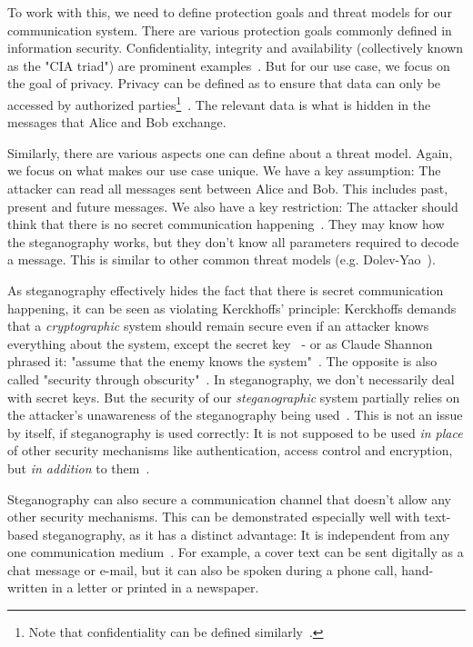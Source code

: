 To work with this, we need to define protection goals and threat models for our communication system. There are various protection goals commonly defined in information security. Confidentiality, integrity and availability (collectively known as the "CIA triad") are prominent examples~\cite{aliIoTSecurityReview2019}. But for our use case, we focus on the goal of privacy. Privacy can be defined as to ensure that data can only be accessed by authorized parties\footnote{Note that confidentiality can be defined similarly~\cite{chowdhuryChatGPTThreatCIA2023}.}~\cite{chowdhuryChatGPTThreatCIA2023}. The relevant data is what is hidden in the messages that Alice and Bob exchange.

Similarly, there are various aspects one can define about a threat model. Again, we focus on what makes our use case unique. We have a key assumption: The attacker can read all messages sent between Alice and Bob. This includes past, present and future messages. We also have a key restriction: The attacker should think that there is no secret communication happening~\cite{al-aniOverviewMainFundamentals2010}. They may know how the steganography works, but they don't know all parameters required to decode a message. This is similar to other common threat models (e.g. Dolev-Yao~\cite{dolevSecurityPublicKey1983}).

As steganography effectively hides the fact that there is secret communication happening, it can be seen as violating Kerckhoffs' principle: Kerckhoffs demands that a \textit{cryptographic} system should remain secure even if an attacker knows everything about the system, except the secret key~\cite{andersonLimitsSteganography1998,smithEffectiveSecurityObscurity2022} - or as Claude Shannon phrased it: "assume that the enemy knows the system"~\cite{shannonCommunicationTheorySecrecy1949}. The opposite is also called "security through obscurity"~\cite{smithEffectiveSecurityObscurity2022}. In steganography, we don't necessarily deal with secret keys. But the security of our \textit{steganographic} system partially relies on the attacker's unawareness of the steganography being used~\cite{al-aniOverviewMainFundamentals2010}. This is not an issue by itself, if steganography is used correctly: It is not supposed to be used \textit{in place} of other security mechanisms like authentication, access control and encryption, but \textit{in addition} to them~\cite{al-aniOverviewMainFundamentals2010}.

Steganography can also secure a communication channel that doesn't allow any other security mechanisms. This can be demonstrated especially well with text-based steganography, as it has a distinct advantage: It is independent from any one communication medium~\cite{zieglerNeuralLinguisticSteganography2019}. For example, a cover text can be sent digitally as a chat message or e-mail, but it can also be spoken during a phone call, hand-written in a letter or printed in a newspaper.

